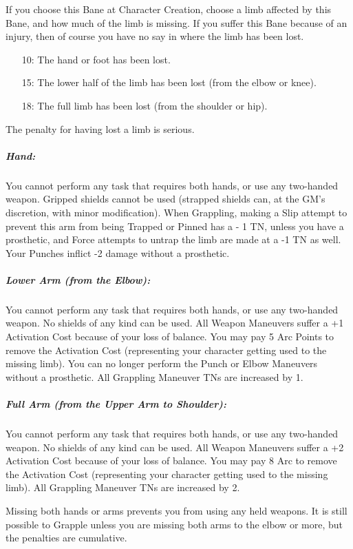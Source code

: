 \documentclass[oneside,11pt,english]{book}
\begin{document}
If you choose this Bane at Character Creation, choose a limb affected by this Bane, and how much of the limb is missing. If you suffer this Bane because of an injury, then of course you have no say in where the limb has been lost.
\begin{itemize}
	\item [10:] The hand or foot has been lost.
	\item [15:] The lower half of the limb has been lost (from the elbow or knee).
	\item [18:] The full limb has been lost (from the shoulder or hip).
\end{itemize}
The penalty for having lost a limb is serious.
\vspace*{-10pt}\subparagraph*{Hand:}
You cannot perform any task that requires both hands, or use any two-handed weapon. Gripped 
shields cannot be used (strapped shields can, at the GM’s discretion, with minor modification). 
When Grappling, making a Slip attempt to prevent this arm from being Trapped or Pinned has a -
1 TN, unless you have a prosthetic, and Force attempts to untrap the limb are made at a -1 TN as 
well. Your Punches inflict -2 damage without a prosthetic. 
\vspace*{-10pt}\subparagraph*{Lower Arm (from the Elbow):}
You cannot perform any task that requires both hands, or use any two-handed weapon. No shields 
of any kind can be used. All Weapon Maneuvers suffer a +1 Activation Cost because of your loss 
of balance. You may pay 5 Arc Points to remove the Activation Cost (representing your character 
getting used to the missing limb). You can no longer perform the Punch or Elbow Maneuvers 
without a prosthetic. All Grappling Maneuver TNs are increased by 1. 
\vspace*{-10pt}\subparagraph*{Full Arm (from the Upper Arm to Shoulder):}
You cannot perform any task that requires both hands, or use any two-handed weapon. No shields 
of any kind can be used. All Weapon Maneuvers suffer a +2 Activation Cost because of your loss 
of balance. You may pay 8 Arc to remove the Activation Cost (representing your character 
getting used to the missing limb). All Grappling Maneuver TNs are increased by 2. 

Missing both hands or arms prevents you from using any held weapons. It is still possible to 
Grapple unless you are missing both arms to the elbow or more, but the penalties are cumulative. 
\end{document}
